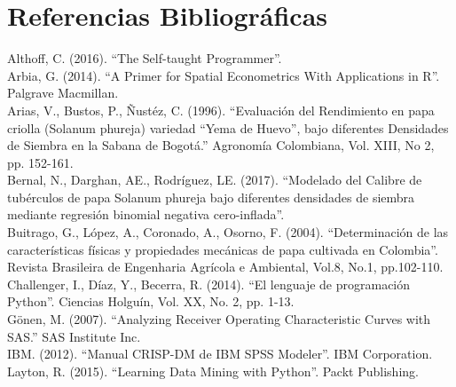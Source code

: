 
\chapter*{Referencias Bibliográficas}

\noindent
Althoff, C. (2016). "`The Self-taught Programmer"'.\\

\noindent
Arbia, G. (2014). "`A Primer for Spatial Econometrics With Applications in R"'. Palgrave Macmillan.\\

\noindent
Arias, V., Bustos, P., Ñustéz, C. (1996). "`Evaluación del Rendimiento en papa criolla (Solanum phureja) variedad "`Yema de Huevo"', bajo diferentes Densidades de Siembra en la Sabana de Bogotá."' Agronomía Colombiana, Vol. XIII, No 2, pp. 152-161.\\

\noindent
Bernal, N., Darghan, AE., Rodríguez, LE. (2017). "`Modelado del Calibre de tubérculos de papa Solanum phureja bajo diferentes densidades de siembra mediante regresión binomial negativa cero-inflada"'.\\

\noindent
Buitrago, G., López, A., Coronado, A., Osorno, F. (2004). "`Determinación de las características físicas y propiedades mecánicas de papa cultivada en Colombia"'. Revista Brasileira de Engenharia Agrícola e Ambiental, Vol.8, No.1, pp.102-110.\\

\noindent
Challenger, I., Díaz, Y., Becerra, R. (2014). "`El lenguaje de programación Python"'. Ciencias Holguín, Vol. XX, No. 2, pp. 1-13.\\

\noindent
Gönen, M. (2007). "`Analyzing Receiver Operating Characteristic Curves with SAS."' SAS Institute Inc.\\

\noindent
IBM. (2012). "`Manual CRISP-DM de IBM SPSS Modeler"'. IBM Corporation.\\

\noindent
Layton, R. (2015). "`Learning Data Mining with Python"'. Packt Publishing.\\


